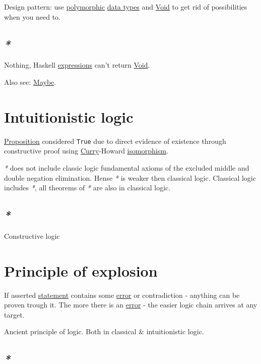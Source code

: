 \documentclass[a4paper,14pt,oneside]{book}
\begin{document}
Design pattern: use \hyperref[org4b65559]{polymorphic} \hyperref[orgd46c48e]{data types} and \hyperref[orgb6f9b0b]{Void} to get rid of possibilities when you need to.

\section{\emph{*}}
\label{sec:org108ca75}
\label{org577b16d}Nothing, Haskell \hyperref[org41ce9e1]{expressions} can't return \hyperref[orgb6f9b0b]{Void}.

Also see: \hyperref[org3b525f5]{Maybe}.

\chapter{Intuitionistic logic}
\label{sec:org36f4f8c}

\hyperref[org619c0bb]{Proposition} considered \texttt{True} due to direct evidence of existence through constructive proof using \hyperref[org2d33b4b]{Curry}-Howard \hyperref[orgd495aa0]{isomorphism}.

\emph{*} does not include classic logic fundamental axioms of the excluded middle and double negation elimination. Hense \emph{*} is weaker then classical logic. Classical logic includes \emph{*}, all theorems of \emph{*} are also in classical logic.

\section{\emph{*}}
\label{sec:org6853f05}

\label{orgb50a6c6}Constructive logic

\chapter{\label{org7bbacec}Principle of explosion}
\label{sec:org60c831a}
If asserted \hyperref[orgb1efd7c]{statement} contains some \hyperref[orgbb60dc6]{error} or contradiction - anything can be proven trough it.
The more there is an \hyperref[orgbb60dc6]{error} - the easier logic chain arrives at any target.

Ancient principle of logic. Both in classical \& intuitionistic logic.

\section{\emph{*}}
\label{sec:orgac440e7}
\end{document}
